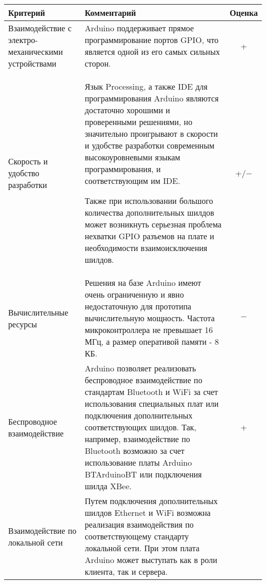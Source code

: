 \bgroup
\def\arraystretch{1.5}%

\begin{longtable}{| p{} | p{} | c |} 

\hline
Критерий & Комментарий & Оценка \\
\hline
Взаимодействие с электро-механическими  устройствами &

Arduino поддерживает прямое программирование портов GPIO, что является одной из его самых сильных сторон\cite{ArduinoGPIO}. &

+ \\

\hline
Скорость и удобство разработки &

Язык Processing, а также IDE для программирования Arduino являются достаточно хорошими и проверенными решениями, но значительно проигрывают в скорости и удобстве разработки современным высокоуровневыми языкам программирования, и соответствующим им IDE.

Также при использовании большого количества дополнительных шилдов может возникнуть серьезная проблема нехватки GPIO разъемов на плате и необходимости взаимоисключения шилдов. &

+/$-$\\

\hline
Вычислительные ресурсы &

Решения на базе Arduino имеют очень ограниченную и явно недостаточную для прототипа вычислительную мощность. Частота микроконтроллера не превышает 16 МГц, а размер оперативой памяти - 8 КБ\cite{Arduino Memory}. &

$-$\\

\hline
Беспроводное взаимодействие &

Arduino позволяет реализовать беспроводное взаимодействие по стандартам Bluetooth и WiFi за счет использования специальных плат или подключения дополнительных соответствующих шилдов. Так, например, взаимодействие по Bluetooth возможно за счет использование платы Arduino BT{ArduinoBT} или подключения шилда XBee\cite{XBee}. &

+\\

\hline
Взаимодействие по локальной сети &

Путем подключения дополнительных шилдов Ethernet\cite{ArduinoEthernet} и WiFi\cite{ArduinoWiFi} возможна реализация взаимодействия по соответствующему стандарту локальной сети. При этом плата Arduino может выступать как в роли клиента\cite{ArduinoClient}, так и сервера\cite{ArduinoServer}.&


\end{longtable}
